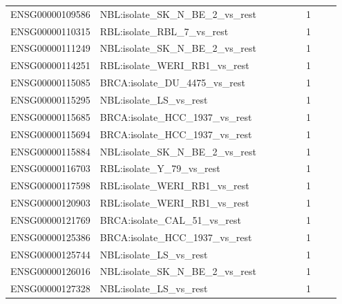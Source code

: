 \begin{landscape}
{\begin{longtable}{p{0.18\linewidth}p{0.65\linewidth}p{0.12\linewidth}}
ENSG00000109586 & NBL:isolate\_\allowbreak{}SK\_\allowbreak{}N\_\allowbreak{}BE\_\allowbreak{}2\_\allowbreak{}vs\_\allowbreak{}rest & 1 \\
ENSG00000110315 & RBL:isolate\_\allowbreak{}RBL\_\allowbreak{}7\_\allowbreak{}vs\_\allowbreak{}rest & 1 \\
ENSG00000111249 & NBL:isolate\_\allowbreak{}SK\_\allowbreak{}N\_\allowbreak{}BE\_\allowbreak{}2\_\allowbreak{}vs\_\allowbreak{}rest & 1 \\
ENSG00000114251 & RBL:isolate\_\allowbreak{}WERI\_\allowbreak{}RB1\_\allowbreak{}vs\_\allowbreak{}rest & 1 \\
ENSG00000115085 & BRCA:isolate\_\allowbreak{}DU\_\allowbreak{}4475\_\allowbreak{}vs\_\allowbreak{}rest & 1 \\
ENSG00000115295 & NBL:isolate\_\allowbreak{}LS\_\allowbreak{}vs\_\allowbreak{}rest & 1 \\
ENSG00000115685 & BRCA:isolate\_\allowbreak{}HCC\_\allowbreak{}1937\_\allowbreak{}vs\_\allowbreak{}rest & 1 \\
ENSG00000115694 & BRCA:isolate\_\allowbreak{}HCC\_\allowbreak{}1937\_\allowbreak{}vs\_\allowbreak{}rest & 1 \\
ENSG00000115884 & NBL:isolate\_\allowbreak{}SK\_\allowbreak{}N\_\allowbreak{}BE\_\allowbreak{}2\_\allowbreak{}vs\_\allowbreak{}rest & 1 \\
ENSG00000116703 & RBL:isolate\_\allowbreak{}Y\_\allowbreak{}79\_\allowbreak{}vs\_\allowbreak{}rest & 1 \\
ENSG00000117598 & RBL:isolate\_\allowbreak{}WERI\_\allowbreak{}RB1\_\allowbreak{}vs\_\allowbreak{}rest & 1 \\
ENSG00000120903 & RBL:isolate\_\allowbreak{}WERI\_\allowbreak{}RB1\_\allowbreak{}vs\_\allowbreak{}rest & 1 \\
ENSG00000121769 & BRCA:isolate\_\allowbreak{}CAL\_\allowbreak{}51\_\allowbreak{}vs\_\allowbreak{}rest & 1 \\
ENSG00000125386 & BRCA:isolate\_\allowbreak{}HCC\_\allowbreak{}1937\_\allowbreak{}vs\_\allowbreak{}rest & 1 \\
ENSG00000125744 & NBL:isolate\_\allowbreak{}LS\_\allowbreak{}vs\_\allowbreak{}rest & 1 \\
ENSG00000126016 & NBL:isolate\_\allowbreak{}SK\_\allowbreak{}N\_\allowbreak{}BE\_\allowbreak{}2\_\allowbreak{}vs\_\allowbreak{}rest & 1 \\
ENSG00000127328 & NBL:isolate\_\allowbreak{}LS\_\allowbreak{}vs\_\allowbreak{}rest & 1 \\

\end{longtable}}
\end{landscape}

